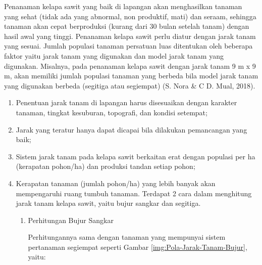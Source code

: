 \begin{enumerate}[label=(\alph*)]
	Penanaman kelapa sawit yang baik di lapangan akan menghasilkan tanaman yang sehat (tidak ada yang abnormal, non produktif, mati) dan seraam, sehingga tanaman akan cepat berproduksi (kurang dari 30 bulan setelah tanam) dengan hasil awal yang tinggi. Penanaman kelapa sawit perlu diatur dengan jarak tanam yang sesuai. Jumlah populasi tanaman persatuan luas ditentukan oleh beberapa faktor yaitu jarak tanam yang digunakan dan model jarak tanam yang digunakan. Misalnya, pada penanaman kelapa sawit dengan jarak tanam 9 m x 9 m, akan memiliki jumlah populasi tanaman yang berbeda bila model jarak tanam yang digunakan berbeda (segitiga atau segiempat) (S. Nora \& C D. Mual, 2018). 
	
	\begin{enumerate}[label=(\alph*)]
		\item Penentuan jarak tanam di lapangan harus disesuaikan dengan karakter tanaman, tingkat kesuburan, topografi, dan kondisi setempat; 
		
		\item Jarak yang teratur hanya dapat dicapai bila dilakukan pemancangan yang baik; 
		
		\item Sistem jarak tanam pada kelapa sawit berkaitan erat dengan populasi per ha (kerapatan pohon/ha) dan produksi tandan setiap pohon; 
		
		\item Kerapatan tanaman (jumlah pohon/ha) yang lebih banyak akan mempengaruhi ruang tumbuh tanaman. 
		Terdapat 2 cara dalam menghitung jarak tanam kelapa sawit, yaitu bujur sangkar dan segitiga. 
		
		\begin{enumerate}
			\item Perhitungan Bujur Sangkar
			
			Perhitungannya sama dengan tanaman yang mempunyai sistem pertanaman segiempat seperti Gambar \ref{img:Pola-Jarak-Tanam-Bujur}, yaitu:
			

\end{enumerate}
\end{enumerate}
\end{enumerate}
